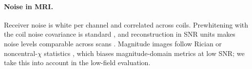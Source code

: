 \paragraph{Noise in MRI.}
Receiver noise is white per channel and correlated across coils. Prewhitening
with the coil noise covariance is standard \citep{roemer1990phased,pruessmann1999sense},
and reconstruction in SNR units makes noise levels comparable across scans
\citep{kellman2005snr}. Magnitude images follow Rician or noncentral-$\chi$
statistics \citep{gudbjartsson1995rician,constantinides1997snr}, which biases
magnitude-domain metrics at low SNR; we take this into account in the low-field
evaluation.
